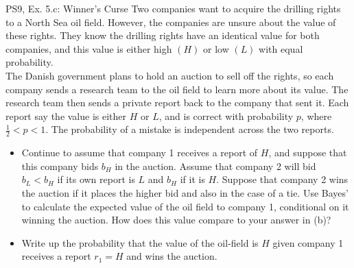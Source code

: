 \begin{frame}{PS9, Ex. 5.c: Winner's Curse}
      Two companies want to acquire the drilling rights to a North Sea oil field. However, the companies are unsure about the value of these rights. They know the drilling rights have an identical value for both companies, and this value is either high $(H)$ or low $(L)$ with equal probability.\\\smallskip
      The Danish government plans to hold an auction to sell off the rights, so each company sends a research team to the oil field to learn more about its value. The research team then sends a private report back to the company that sent it. Each report say the value is either $H$ or $L$, and is correct with probability $p$, where $\frac{1}{2} < p < 1$. The probability of a mistake is independent across the two reports.
      \vspace{-2pt}
      \begin{itemize}
        \item[(c)] Continue to assume that company 1 receives a report of $H$, and suppose that this company bids $b_H$ in the auction. Assume that company 2 will bid $b_L < b_H$ if its own report is $L$ and $b_H$ if it is $H$. Suppose that company 2 wins the auction if it places the higher bid and also in the case of a tie. Use Bayes’ to calculate the expected value of the oil field to company 1, conditional on it winning the auction. How does this value compare to your answer in (b)?
        \item[Step 1:] Write up the probability that the value of the oil-field is $H$ given company 1 receives a report $r_1=H$ and wins the auction.
        \end{itemize}
      \vfill\null
\end{frame}
